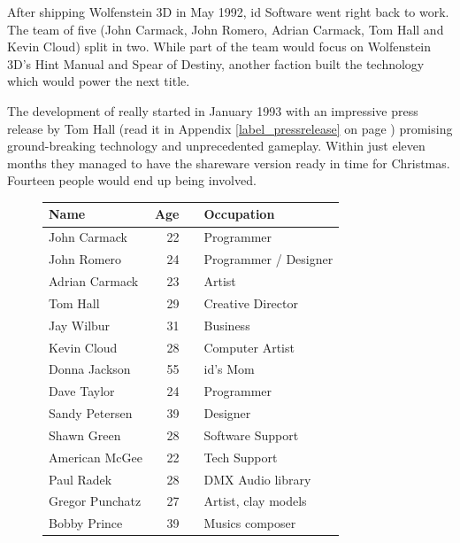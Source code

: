 \vspace{-5pt}
After shipping Wolfenstein 3D in May 1992, id Software went right back to work. The team of five (John Carmack, John Romero, Adrian Carmack, Tom Hall and Kevin Cloud) split in two. While part of the team would focus on Wolfenstein 3D's Hint Manual and Spear of Destiny, another faction built the technology which would power the next title.\\
\par
The development of \doom{} really started in January 1993 with an impressive press release by Tom Hall (read it in Appendix \ref{label_pressrelease} on page \pageref{label_pressrelease}) promising ground-breaking technology and unprecedented gameplay. Within just eleven months they managed to have the shareware version ready in time for Christmas. Fourteen people would end up being involved.\\
\par
 \begin{figure}[H]
\centering  
\begin{tabularx}{\textwidth}{L{0.3} R{0.2} L{0.1} L{0.4}  }
  \toprule
  \textbf{Name} &  \textbf{Age} & &\textbf{Occupation} \\
  \toprule 
   John Carmack & 22 &  &Programmer\\
   John Romero & 24 &  &Programmer / Designer\\
   Adrian Carmack\protect\footnotemark & 23 &  &Artist\\
   Tom Hall\protect\footnotemark  & 29 &  &Creative Director\\
   Jay Wilbur & 31 &  &Business\\
   Kevin Cloud& 28 &  &Computer Artist\\
   Donna Jackson & 55 & &id's Mom\\   
   Dave Taylor & 24 & &Programmer\\
   Sandy Petersen & 39 & &Designer\\
   Shawn Green & 28 & &Software Support\\
   American McGee & 22 & &Tech Support\\
   Paul Radek & 28 & &DMX Audio library\\
   Gregor Punchatz & 27 & &Artist, clay models\\
   Bobby Prince & 39 & & Musics composer\\
     \toprule
\end{tabularx}
\label{fig:Id Software team}
\end{figure}



